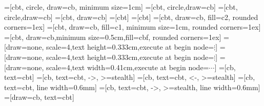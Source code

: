 \usepackage{amsmath}
\usepackage{amssymb}
\usepackage{mathtools}
\usepackage{bm}
\usepackage{tikz}
\usetikzlibrary{positioning}
\usetikzlibrary{calc}

\newcommand{\matr}[1]{\bm{#1}}
\newcommand{\vect}[1]{\bm{#1}}
\def\RSet{\mathbb{R}}


=[cbt, circle, draw=cb, minimum size=1cm]
=[cbt, circle,draw=cb]
=[cbt, circle,draw=cb]
=[cbt, draw=cb]
=[cbt]
=[cbt]
=[cbt, draw=cb, fill=c2, rounded corners=1ex]
=[cbt, draw=cb, fill=c1, minimum size=1cm, rounded corners=1ex]
=[cbt, draw=cb,minimum size=0.5cm,fill=cbf, rounded corners=1ex]
=[draw=none, scale=4,text height=0.333cm,execute at begin node=\color{black}$\vdots$]
=[draw=none, scale=4,text height=0.333cm,execute at begin node=\color{black}$\vdots$]
=[draw=none, scale=4,text width=0.41cm,execute at
begin node=\color{black}$\cdots$]
=[cb, text=cbt]
=[cb, text=cbt, ->, >=stealth]
=[cb, text=cbt, <-, >=stealth]
=[cb, text=cbt, line width=0.6mm]
=[cb, text=cbt, ->, >=stealth, line width=0.6mm]
=[draw=cb, text=cbt]

